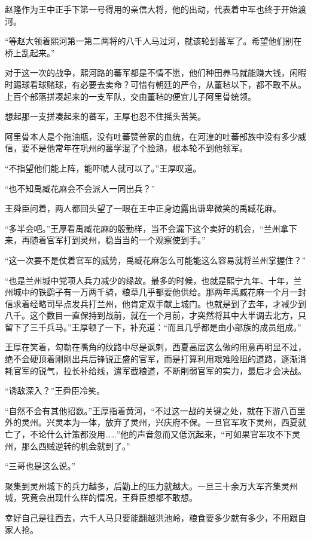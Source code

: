 赵隆作为王中正手下第一号得用的亲信大将，他的出动，代表着中军也终于开始渡河。

“等赵大领着熙河第一第二两将的八千人马过河，就该轮到蕃军了。希望他们别在桥上乱起来。”

对于这一次的战争，熙河路的蕃军都是不情不愿，他们种田养马就能赚大钱，闲暇时踢球看球赌球，有必要去卖命？可惜有朝廷的严令，从董毡以下，都不敢不从。上百个部落拼凑起来的一支军队，交由董毡的便宜儿子阿里骨统领。

想起那一支拼凑起来的蕃军，王厚也忍不住摇头苦笑。

阿里骨本人是个拖油瓶，没有吐蕃赞普家的血统，在河湟的吐蕃部族中没有多少威信，要不是他常年在巩州的蕃学混了个脸熟，根本轮不到他领军。

“不指望他们能上阵，能吓唬人就可以了。”王厚叹道。

“也不知禹臧花麻会不会派人一同出兵？”

王舜臣问着，两人都回头望了一眼在王中正身边露出谦卑微笑的禹臧花麻。

“多半会吧。”王厚看禹臧花麻的殷勤样，当不会漏下这个卖好的机会，“兰州拿下来，再随着官军打到灵州，稳当当的一个观察使到手。”

“这一次要不是仗着官军的威势，禹臧花麻怎么可能能这么容易就将兰州掌握住？”

“也是兰州城中党项人兵力减少的缘故。最多的时候，也就是熙宁九年、十年，兰州城中的铁鹞子有一万两千骑，粮草几乎都要他供给。那两年禹臧花麻一个月一封信求着经略司早点发兵打兰州，他肯定双手献上城门。也就是到了去年，才减少到八千。这个数目一直保持到战前，就在一个月前，才突然将其中大半调去北方，只留下了三千兵马。”王厚顿了一下，补充道：“而且几乎都是由小部族的成员组成。”

王厚在笑着，勾勒在嘴角的纹路中尽是讽刺，西夏高层这么做的用意再明显不过，绝不会硬顶着刚刚出兵后锋锐正盛的官军，而是打算利用艰难险阻的道路，逐渐消耗官军的锐气，拉长补给线，遣军截粮道，不断削弱官军的实力，最后才会决战。

“诱敌深入？”王舜臣冷笑。

“自然不会有其他招数。”王厚指着黄河，“不过这一战的关键之处，就在下游八百里外的灵州。兴灵本为一体，放弃了灵州，兴庆府不保。一旦官军攻下灵州，西夏就亡了，不论什么计策都没用……”他的声音忽而又低沉起来，“可如果官军攻不下灵州，那么西贼逆转的机会就到了。”

“三哥也是这么说。”

聚集到灵州城下的兵力越多，后勤上的压力就越大。一旦三十余万大军齐集灵州城，究竟会出现什么样的情况，王舜臣想都不敢想。

幸好自己是往西去，六千人马只要能翻越洪池岭，粮食要多少就有多少，不用跟自家人抢。

